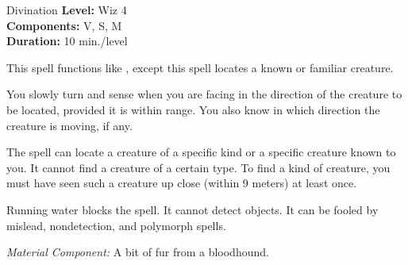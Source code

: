 {Divination}
{
	\textbf{Level:}
	Wiz 4\\
	\textbf{Components:}
	V, S, M\\
	\textbf{Duration:}
	10 min./level\\
}
{
	This spell functions like , except this spell locates a known or familiar creature.

	You slowly turn and sense when you are facing in the direction of the creature to be located, provided it is within range. You also know in which direction the creature is moving, if any.

	The spell can locate a creature of a specific kind or a specific creature known to you. It cannot find a creature of a certain type. To find a kind of creature, you must have seen such a creature up close (within 9 meters) at least once.

	Running water blocks the spell. It cannot detect objects. It can be fooled by mislead, nondetection, and polymorph spells.

	\textit{Material Component:}
	A bit of fur from a bloodhound.

}
